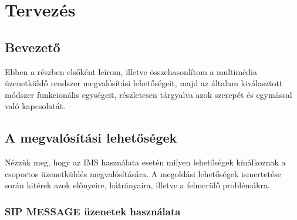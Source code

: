 \setcounter{tocdepth}{5}

\section{Tervezés}

\subsection{Bevezető}

Ebben a részben elsőként leírom, illetve összehasonlítom a multimédia üzenetküldő rendszer megvalósítási lehetőségeit, majd az általam kiválasztott módszer funkcionális egységeit,  részletesen tárgyalva azok szerepét és egymással való kapcsolatát.

\subsection{A megvalósítási lehetőségek}

Nézzük meg, hogy az IMS használata esetén milyen lehetőségek kínálkoznak a csoportos üzenetküldés megvalósítására. A megoldási lehetőségek ismertetése során kitérek azok előnyeire, hátrányaira, illetve a felmerülő problémákra.

\subsubsection{SIP MESSAGE üzenetek használata}
\label{sec:sip_message}

